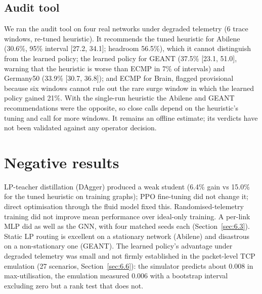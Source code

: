 \documentclass[journal]{IEEEtran}
\begin{document}
\subsection{Audit tool}
\label{sec:6.7}
We ran the audit tool on four real networks under degraded telemetry (6 trace windows, re-tuned heuristic). It recommends the tuned heuristic for Abilene (30.6\%, 95\% interval [27.2, 34.1]; headroom 56.5\%), which it cannot distinguish from the learned policy; the learned policy for GEANT (37.5\% [23.1, 51.0], warning that the heuristic is worse than ECMP in 7\% of intervals) and Germany50 (33.9\% [30.7, 36.8]); and ECMP for Brain, flagged provisional because six windows cannot rule out the rare surge window in which the learned policy gained 21\%. With the single-run heuristic the Abilene and GEANT recommendations were the opposite, so close calls depend on the heuristic's tuning and call for more windows. It remains an offline estimate; its verdicts have not been validated against any operator decision.

\section{Negative results}
\label{sec:7}
LP-teacher distillation (DAgger) produced a weak student (6.4\% gain vs 15.0\% for the tuned heuristic on training graphs); PPO fine-tuning did not change it; direct optimisation through the fluid model fixed this. Randomised-telemetry training did not improve mean performance over ideal-only training. A per-link MLP did as well as the GNN, with four matched seeds each (Section~\ref{sec:6.3}). Static LP routing is excellent on a stationary network (Abilene) and disastrous on a non-stationary one (GEANT). The learned policy's advantage under degraded telemetry was small and not firmly established in the packet-level TCP emulation (27 scenarios, Section~\ref{sec:6.6}): the simulator predicts about 0.008 in max-utilisation, the emulation measured 0.006 with a bootstrap interval excluding zero but a rank test that does not.
\end{document}
